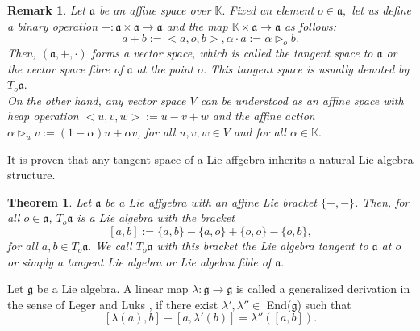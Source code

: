 \documentclass{article}
\newtheorem{remark}{Remark}[section]
\newtheorem{theorem}{Theorem}[section]
\theoremstyle{definition}
\theoremstyle{remark}
\theoremstyle{plain}
\begin{document}
\begin{remark}\cite{And2}
    Let $\mathfrak{a}$ be an affine space over $\mathbb{K}.$ Fixed an element $o\in \mathfrak{a},$ let us define a binary operation $+: \mathfrak{a} \times \mathfrak{a} \rightarrow \mathfrak{a}$ and the map $\mathbb{K} \times \mathfrak{a}\rightarrow \mathfrak{a}$ as follows:
    $$a+b:=<a, o, b>, \alpha\cdot a:=\alpha \triangleright_{o}b.$$
    Then, $(\mathfrak{a}, +, \cdot)$ forms a vector space, which is called the tangent space to $\mathfrak{a}$ or the vector
    space fibre of $\mathfrak{a}$ at the point $o$. This tangent space is usually denoted by $T_{o}\mathfrak{a}.$\\

    On the other hand, any vector space $V$ can be understood as an affine space with heap operation $<u, v, w>:=u-v+w$ and the affine action $\alpha\triangleright_{u}v:=(1-\alpha)u+\alpha v$, for all $u, v, w\in V$ and for all $\alpha \in \mathbb{K}.$
\end{remark}
It is proven that any tangent space of a Lie affgebra inherits a natural Lie algebra structure.

\begin{theorem}\cite{And2}
    Let $\mathfrak{a}$ be a Lie affgebra with an affine Lie bracket $\{-, -\}$. Then, for all $o \in \mathfrak{a}$, $T_{o}\mathfrak{a}$ is a Lie algebra with the bracket 
    $$[a, b]:=\{a, b\}-\{a, o\}+\{o, o\}-\{o, b\},$$
    for all $a, b \in T_{o}\mathfrak{a}.$ We call $T_{o}\mathfrak{a}$ with this bracket the Lie algebra tangent to $\mathfrak{a}$ at $o$ or simply a tangent Lie algebra or Lie algebra fible of $\mathfrak{a}.$
\end{theorem}
Let $\mathfrak{g}$ be a Lie algebra. A linear map $\lambda: \mathfrak{g}\rightarrow \mathfrak{g}$ is called a generalized derivation in the sense of Leger and Luks \cite{Leg1}, if there exist $\lambda', \lambda'' \in$ End($\mathfrak{g}$) such that
 $$
 [\lambda(a), b]+[a, \lambda'(b)]=\lambda''([a, b]).
 $$
\end{document}
